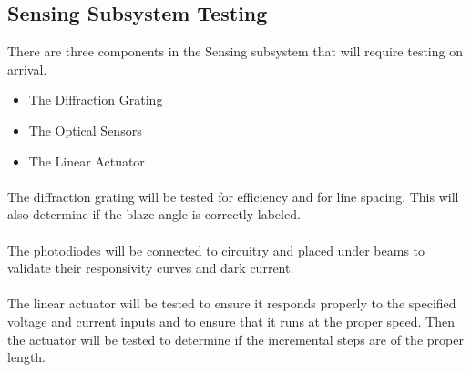 \subsection{Sensing Subsystem Testing}
\label{sec:sensing_subsystem_testing}


There are three components in the Sensing subsystem that will require testing on arrival.
\begin{itemize}
    \item The Diffraction Grating
    \item The Optical Sensors
    \item The Linear Actuator
\end{itemize}


\paragraph{} The diffraction grating will be tested for efficiency and for line spacing. This will also determine if the blaze angle is correctly labeled.


\paragraph{} The photodiodes will be connected to circuitry and placed under beams to validate their responsivity curves and dark current.


\paragraph{} The linear actuator will be tested to ensure it responds properly to the specified voltage and current inputs and to ensure that it runs at the proper speed. Then the actuator will be tested to determine if the incremental steps are of the proper length.
